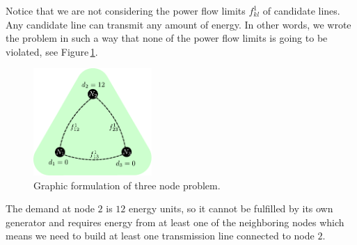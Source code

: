 Notice that we are not considering the power flow limits $f_{kl}^{1}$ of candidate lines. Any candidate line can transmit any amount of energy. In other words, we wrote the problem in such a way that none of the power flow limits is going to be violated, see Figure\,\ref{fig: Green_inital}.
\begin{figure}[H]
  \begin{center}
\includegraphics[width=0.4\textwidth]{Figures/Green_Initial.pdf}
  \end{center}
  \caption{Graphic formulation of three node problem.}
  \label{fig: Green_inital}
\end{figure}
The demand at node $2$ is $12$ energy units, so it cannot be fulfilled by its own generator and requires energy from at least one of the neighboring nodes which means we need to build at least one transmission line connected to node $2$.
